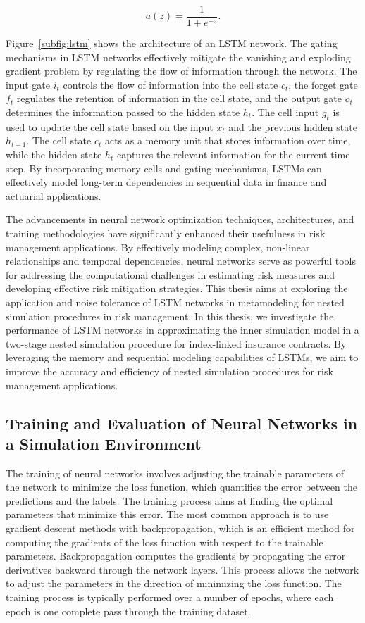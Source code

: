 \begin{equation*}
    a(z) = \frac{1}{1 + e^{-z}}.
\end{equation*}

Figure~\ref{subfig:lstm} shows the architecture of an LSTM network.
The gating mechanisms in LSTM networks effectively mitigate the vanishing and exploding gradient problem by regulating the flow of information through the network.
The input gate $i_t$ controls the flow of information into the cell state $c_t$, the forget gate $f_t$ regulates the retention of information in the cell state, and the output gate $o_t$ determines the information passed to the hidden state $h_t$.
The cell input $g_t$ is used to update the cell state based on the input $x_t$ and the previous hidden state $h_{t-1}$.
The cell state $c_t$ acts as a memory unit that stores information over time, while the hidden state $h_t$ captures the relevant information for the current time step.
By incorporating memory cells and gating mechanisms, LSTMs can effectively model long-term dependencies in sequential data in finance and actuarial applications.

The advancements in neural network optimization techniques, architectures, and training methodologies have significantly enhanced their usefulness in risk management applications.
By effectively modeling complex, non-linear relationships and temporal dependencies, neural networks serve as powerful tools for addressing the computational challenges in estimating risk measures and developing effective risk mitigation strategies.
This thesis aims at exploring the application and noise tolerance of LSTM networks in metamodeling for nested simulation procedures in risk management.
In this thesis, we investigate the performance of LSTM networks in approximating the inner simulation model in a two-stage nested simulation procedure for index-linked insurance contracts.
By leveraging the memory and sequential modeling capabilities of LSTMs, we aim to improve the accuracy and efficiency of nested simulation procedures for risk management applications.

\subsection{Training and Evaluation of Neural Networks in a Simulation Environment}

The training of neural networks involves adjusting the trainable parameters of the network to minimize the loss function, which quantifies the error between the predictions and the labels.
The training process aims at finding the optimal parameters that minimize this error.
The most common approach is to use gradient descent methods with backpropagation, which is an efficient method for computing the gradients of the loss function with respect to the trainable parameters.
Backpropagation computes the gradients by propagating the error derivatives backward through the network layers.
This process allows the network to adjust the parameters in the direction of minimizing the loss function.
The training process is typically performed over a number of epochs, where each epoch is one complete pass through the training dataset.

